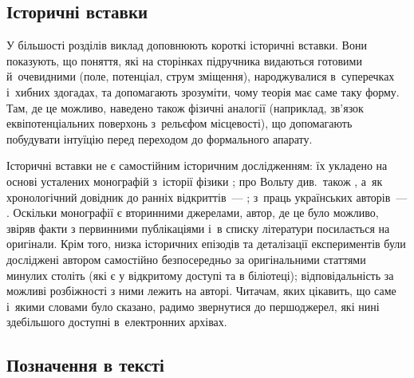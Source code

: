 \subsection*{Історичні вставки}

У більшості розділів виклад доповнюють короткі історичні вставки. Вони показують, що
поняття, які на сторінках підручника видаються готовими й~очевидними (поле, потенціал,
струм зміщення), народжувалися в~суперечках і~хибних здогадах, та допомагають зрозуміти,
чому теорія має саме таку форму. Там, де це можливо, наведено також фізичні аналогії
(наприклад, зв'язок еквіпотенціальних поверхонь з~рельєфом місцевості), що допомагають
побудувати інтуїцію перед переходом до формального апарату.

Історичні вставки не є самостійним історичним дослідженням: їх укладено на основі
усталених монографій з~історії фізики
\cite{Heilbron1979,Whittaker1951History,Whittaker1953History,Jungnickel1986Intellectual,
Hunt1991Maxwellians,Darrigol2000,Buchwald1985FaradayToMaxwell}; про Вольту див.~також
\cite{Pancaldi2003}, а~як хронологічний довідник до ранніх відкриттів~---
\cite{Mottelay1922Bibliographical}; з~праць українських авторів~---
\cite{Khramov2012Fizyka,Kudryavtsev1951Istoriya}. Оскільки монографії
є вторинними джерелами, автор, де це було можливо, звіряв факти з первинними публікаціями
і~в списку літератури посилається на оригінали. Крім того, низка історичних епізодів та
деталізації експериментів були досліджені автором самостійно безпосередньо за
оригінальними статтями минулих століть (які є у відкритому доступі та в біліотеці);
відповідальність за можливі розбіжності з ними
лежить на авторі. Читачам, яких цікавить, що саме і~якими словами було сказано, радимо
звернутися до першоджерел, які нині здебільшого доступні в~електронних архівах.

\subsection*{Позначення в тексті}


